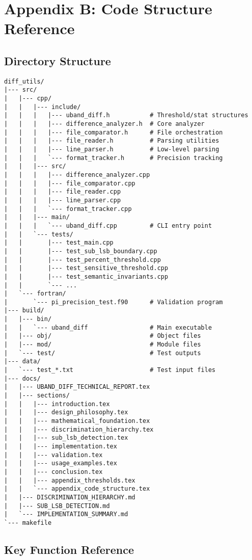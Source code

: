 \section{Appendix B: Code Structure Reference}
\label{app:code}

\subsection{Directory Structure}

\begin{verbatim}
diff_utils/
|--- src/
|   |--- cpp/
|   |   |--- include/
|   |   |   |--- uband_diff.h           # Threshold/stat structures
|   |   |   |--- difference_analyzer.h  # Core analyzer
|   |   |   |--- file_comparator.h      # File orchestration
|   |   |   |--- file_reader.h          # Parsing utilities
|   |   |   |--- line_parser.h          # Low-level parsing
|   |   |   `--- format_tracker.h       # Precision tracking
|   |   |--- src/
|   |   |   |--- difference_analyzer.cpp
|   |   |   |--- file_comparator.cpp
|   |   |   |--- file_reader.cpp
|   |   |   |--- line_parser.cpp
|   |   |   `--- format_tracker.cpp
|   |   |--- main/
|   |   |   `--- uband_diff.cpp         # CLI entry point
|   |   `--- tests/
|   |       |--- test_main.cpp
|   |       |--- test_sub_lsb_boundary.cpp
|   |       |--- test_percent_threshold.cpp
|   |       |--- test_sensitive_threshold.cpp
|   |       |--- test_semantic_invariants.cpp
|   |       `--- ...
|   `--- fortran/
|       `--- pi_precision_test.f90      # Validation program
|--- build/
|   |--- bin/
|   |   `--- uband_diff                 # Main executable
|   |--- obj/                           # Object files
|   |--- mod/                           # Module files
|   `--- test/                          # Test outputs
|--- data/
|   `--- test_*.txt                     # Test input files
|--- docs/
|   |--- UBAND_DIFF_TECHNICAL_REPORT.tex
|   |--- sections/
|   |   |--- introduction.tex
|   |   |--- design_philosophy.tex
|   |   |--- mathematical_foundation.tex
|   |   |--- discrimination_hierarchy.tex
|   |   |--- sub_lsb_detection.tex
|   |   |--- implementation.tex
|   |   |--- validation.tex
|   |   |--- usage_examples.tex
|   |   |--- conclusion.tex
|   |   |--- appendix_thresholds.tex
|   |   `--- appendix_code_structure.tex
|   |--- DISCRIMINATION_HIERARCHY.md
|   |--- SUB_LSB_DETECTION.md
|   `--- IMPLEMENTATION_SUMMARY.md
`--- makefile
\end{verbatim}

\subsection{Key Function Reference}

